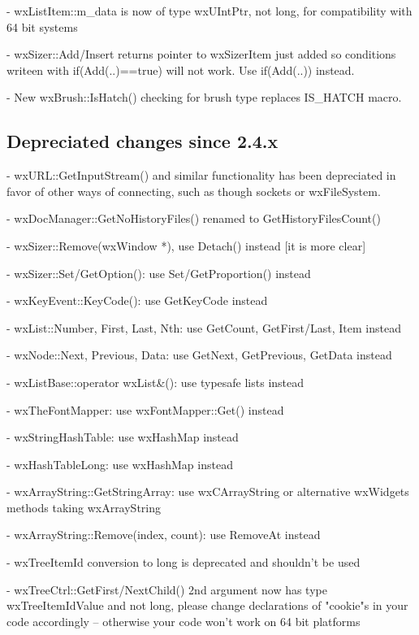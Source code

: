- wxListItem::m\_data is now of type wxUIntPtr, not long, for compatibility
  with 64 bit systems

- wxSizer::Add/Insert returns pointer to wxSizerItem just added so conditions
  writeen with if(Add(..)==true) will not work. Use if(Add(..)) instead.

- New wxBrush::IsHatch() checking for brush type replaces IS_HATCH macro.



\subsection{Depreciated changes since 2.4.x}\label{depreciatedsince24}

- wxURL::GetInputStream() and similar functionality has been depreciated in
  favor of other ways of connecting, such as though sockets or wxFileSystem.

- wxDocManager::GetNoHistoryFiles() renamed to GetHistoryFilesCount()

- wxSizer::Remove(wxWindow *), use Detach() instead [it is more clear]

- wxSizer::Set/GetOption(): use Set/GetProportion() instead

- wxKeyEvent::KeyCode(): use GetKeyCode instead

- wxList::Number, First, Last, Nth: use GetCount, GetFirst/Last, Item instead

- wxNode::Next, Previous, Data: use GetNext, GetPrevious, GetData instead

- wxListBase::operator wxList&(): use typesafe lists instead

- wxTheFontMapper: use wxFontMapper::Get() instead

- wxStringHashTable: use wxHashMap instead

- wxHashTableLong: use wxHashMap instead

- wxArrayString::GetStringArray: use wxCArrayString or alternative wxWidgets
                                 methods taking wxArrayString

- wxArrayString::Remove(index, count): use RemoveAt instead

- wxTreeItemId conversion to long is deprecated and shouldn't be used

- wxTreeCtrl::GetFirst/NextChild() 2nd argument now has type wxTreeItemIdValue
  and not long, please change declarations of "cookie"s in your code
  accordingly -- otherwise your code won't work on 64 bit platforms

